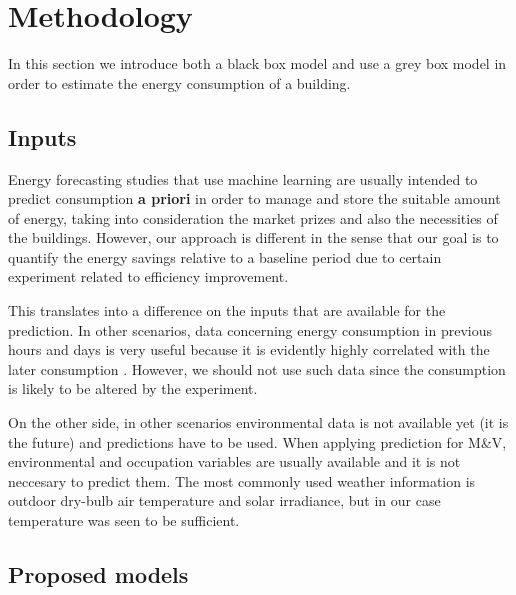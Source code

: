 \documentclass[10pt, conference, compsocconf]{IEEEtran}
\begin{document}



\section{Methodology}

In this section we introduce both a black box model and use a grey box model in order to estimate the energy consumption of a building.

\subsection{Inputs}


Energy forecasting studies that use machine learning are usually intended to predict consumption \textbf{a priori} in order to manage and store the suitable amount of energy, taking into consideration the market prizes and also the necessities of the buildings. However, our approach is different in the sense that our goal is to quantify the energy savings relative to a baseline period due to certain experiment related to efficiency improvement. 

This translates into a difference on the inputs that are available for the prediction. In other scenarios, data concerning energy consumption in previous hours and days is very useful because it is evidently highly correlated with the later consumption \cite{aman2014empirical}. However, we should not use such data since the consumption is likely to be altered by the experiment.

On the other side, in other scenarios environmental data is not available yet (it is the future) and predictions have to be used. When applying prediction for M\&V, environmental and occupation variables are usually available and it is not neccesary to predict them. The most commonly used weather information is outdoor dry-bulb air temperature and solar irradiance, but in our case temperature was seen to be sufficient.



\subsection{Proposed models}
\end{document}
